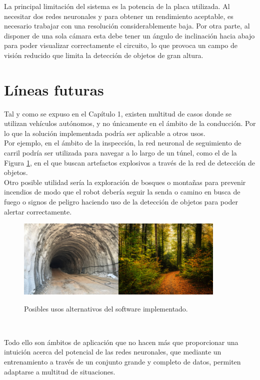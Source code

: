 La principal limitación del sistema es la potencia de la placa utilizada. Al necesitar dos redes neuronales y para obtener un rendimiento aceptable, es necesario trabajar con una resolución considerablemente baja. Por otra parte, al disponer de una sola cámara esta debe tener un ángulo de inclinación hacia abajo para poder visualizar correctamente el circuito, lo que provoca un campo de visión reducido que limita la detección de objetos de gran altura.

\section{Líneas futuras}
\label{section:future}
Tal y como se expuso en el Capítulo 1, existen multitud de casos donde se utilizan vehículos autónomos, y no únicamente en el ámbito de la conducción. Por lo que la solución implementada podría ser aplicable a otros usos.\\ 

Por ejemplo, en el ámbito de la inspección, la red neuronal de seguimiento de carril podría ser utilizada para navegar a lo largo de un túnel, como el de la Figura \ref{fig:moreusages}, en el que buscan artefactos explosivos a través de la red de detección de objetos.\\

Otro posible utilidad sería la exploración de bosques o montañas para prevenir incendios de modo que el robot debería seguir la senda o camino en busca de fuego o signos de peligro haciendo uso de la detección de objetos para poder alertar correctamente.
\begin{figure} [h!]
	\begin{center}
		\includegraphics[width=5cm]{figs/tunel}\hspace{0.5cm}\includegraphics[width=5cm]{figs/forest}
	\end{center}
	\caption{Posibles usos alternativos del software implementado.}
	\label{fig:moreusages}
\end{figure}\

Todo ello son ámbitos de aplicación que no hacen más que proporcionar una intuición acerca del potencial de las redes neuronales, que mediante un entrenamiento a través de un conjunto grande y completo de datos, permiten adaptarse a multitud de situaciones.\\

